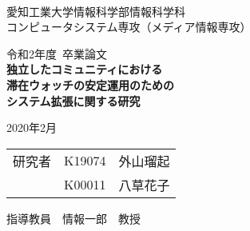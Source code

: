 \begin{titlepage}

  \ \\
  \begin{center}

    {\LARGE 愛知工業大学情報科学部情報科学科\\
      コンピュータシステム専攻（メディア情報専攻）

      \vspace{1.0cm}

      令和2年度~卒業論文\\

      \vspace{2.0cm}
      {\Huge
        \baselineskip=15mm
        \textbf{独立したコミュニティにおける\\滞在ウォッチの安定運用のための\\システム拡張に関する研究\\}}

      \vspace{7.0cm}

      2020年2月\\

      \vspace{1.0cm}

      \begin{tabular}[h]{lll}
        研究者 & K19074 & 外山瑠起 \\
               & K00011 & 八草花子 \\
      \end{tabular}

      \vspace{1.0cm}

      指導教員\ \ 情報一郎\ \ 教授}

  \end{center}

\end{titlepage}
